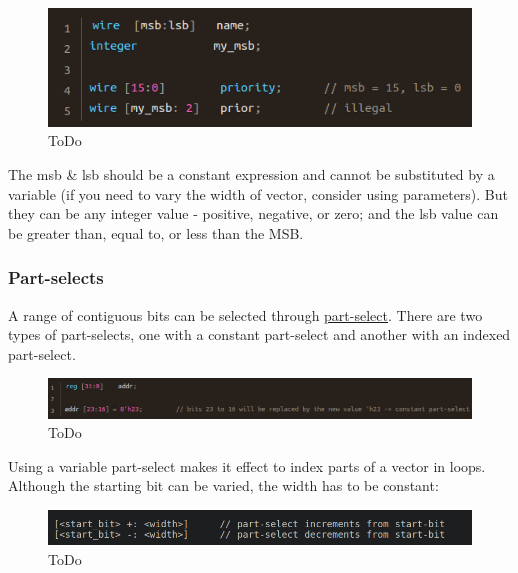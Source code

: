 \documentclass{article}
\begin{document}
	\begin{figure}[H]
		\includegraphics[width=\linewidth]{VerilogPics/figure_15.png}
		\caption{ToDo}
		\label{ToDo}
	\end{figure}

	The msb \& lsb should be a constant expression and cannot be substituted by a variable (if you need to vary the width of vector, consider using parameters). But they can be any integer value -
	positive, negative, or zero; and the lsb value can be greater than, equal to, or less than the MSB.

	\subsubsection{Part-selects}

	A range of contiguous bits can be selected through \underline{part-select}. There are two types of part-selects, one with a constant part-select and another with an indexed part-select. \newlin

	\begin{figure}[H]
		\includegraphics[width=\linewidth]{VerilogPics/figure_16.png}
		\caption{ToDo}
		\label{ToDo}
	\end{figure}

	Using a variable part-select makes it effect to index parts of a vector in loops. Although the starting bit can be varied, the width has to be constant:

	\begin{figure}[H]
		\includegraphics[width=\linewidth]{VerilogPics/figure_17.png}
		\caption{ToDo}
		\label{ToDo}
	\end{figure}
\end{document}
